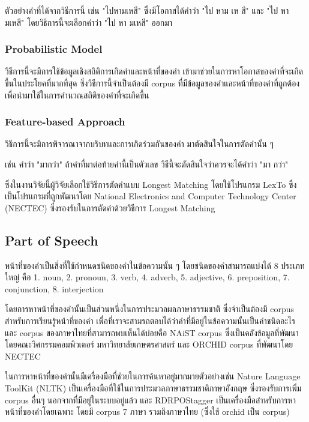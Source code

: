 ตัวอย่างคำที่ได้จากวิธีการนี้ เช่น "ไปหามเหสี" ซึ่งมีโอกาสได้คำว่า "ไป หาม เห สี" และ "ไป หา มเหสี" โดยวิธีการนี้จะเลือกคำว่า "ไป หา มเหสี" ออกมา
\subsubsection{Probabilistic Model\cite{thaiwordfilter}}
วิธีการนี้จะมีการใช้ข้อมูลเชิงสถิติการเกิดคำและหน้าที่ของคำ เข้ามาช่วยในการหาโอกาสของคำที่จะเกิดขึ้นในประโยคที่มากที่สุด ซึ่งวิธีการนี้จำเป็นต้องมี corpus ที่มีข้อมูลของคำและหน้าที่ของคำที่ถูกต้อง เพื่อนำมาใช้ในการคำนวณสถิติของคำที่จะเกิดขึ้น
\subsubsection{Feature-based Approach\cite{featurethaiwordseg}}

วิธีการนี้จะมีการพิจารณาจากบริบทและการเกิดร่วมกันของคำ มาตัดสินใจในการตัดคำนั้น ๆ

เช่น คำว่า "มากว่า" ถ้าคำที่มาต่อท้ายคำนี้เป็นตัวเลข วิธีนี้จะตัดสินใจว่าควรจะได้คำว่า "มา กว่า"

ซึ่งในงานวิจัยนี้ผู้วิจัยเลือกใช้วิธีการตัดคำแบบ Longest Matching โดยใช้โปรแกรม LexTo\cite{LexTo} ซึ่งเป็นโปรแกรมที่ถูกพัฒนาโดย National Electronics and Computer Technology Center (NECTEC) ซึ่งรองรับในการตัดคำด้วยวิธีการ Longest Matching
\subsection{Part of Speech}
หน้าที่ของคำเป็นสิ่งที่ใช้กำหนดชนิดของคำในข้อความนั้น ๆ โดยชนิดของคำสามารถแบ่งได้ 8 ประเภทใหญ่ คือ
1. noun,
2. pronoun,
3. verb,
4. adverb,
5. adjective,
6. preposition,
7. conjunction,
8. interjection

โดยการหาหน้าที่ของคำนั้นเป็นส่วนหนึ่งในการประมวลผลภาษาธรรมชาติ ซึ่งจำเป็นต้องมี corpus สำหรับการเรียนรู้หน้าที่ของคำ เพื่อที่เราจะสามรถตอบได้ว่าคำที่มีอยู่ในข้อความนั้นเป็นคำชนิดอะไร และ corpus ของภาษาไทยที่สามารถพบเห็นได้บ่อยคือ NAiST\cite{NAiST} corpus ซึ่งเป็นคลังข้อมูลที่พัฒนาโดยคณะวิศกรรมคอมพิวเตอร์ มหาวิทยาลัยเกษตรศาสตร์ และ ORCHID\cite{ORCHID} corpus ที่พัฒนาโดย NECTEC

ในการหาหน้าที่ของคำนั้นมีเครื่องมือที่ช่วยในการค้นหาอยู่มากมายตัวอย่างเช่น Nature Language ToolKit (NLTK)\cite{NLTK} เป็นเครื่องมือที่ใช้ในการประมวลภาษาธรรมชาติภาษาอังกฤษ ซึ่งรองรับการเพิ่ม corpus อื่นๆ นอกจากที่มีอยู่ในระบบอยู่แล้ว 
และ RDRPOStagger\cite{RDRPOSTagger} เป็นเครื่องมือสำหรับการหาหน้าที่ของคำโดยเฉพาะ โดยมี corpus 7 ภาษา รวมถึงภาษาไทย (ซึ่งใช้ orchid เป็น corpus)

